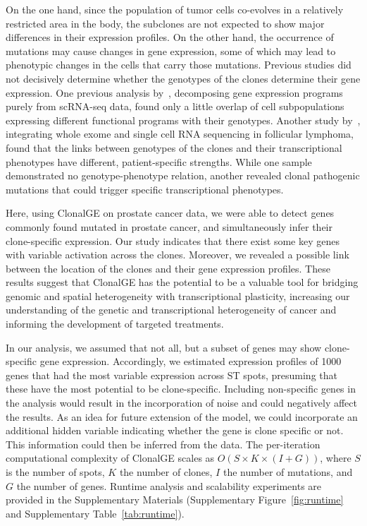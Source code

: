 \documentclass[unnumsec,webpdf,contemporary,large]{oup-authoring-template}%
\theoremstyle{thmstyleone}%
\theoremstyle{thmstyletwo}%
\theoremstyle{thmstylethree}%
\newcommand{\rev}[1]{{\color{revisionblue}#1}}
\begin{document}
 On the one hand, since the population of tumor cells co-evolves in a relatively restricted area in the body, the subclones are not expected to show major differences in their expression profiles. On the other hand, the occurrence of mutations may cause changes in gene expression, some of which may lead to phenotypic changes in the  cells that carry those mutations. Previous studies did not decisively determine whether the genotypes of the clones determine their gene expression. One previous analysis by~\cite{Kinker2020},  decomposing gene expression programs purely from scRNA-seq data,  found only a little overlap of cell subpopulations expressing different functional programs with their genotypes. Another study by~\cite{Oksza-Orzechowski2024}, integrating whole exome and single cell RNA sequencing in follicular lymphoma, found that the links between genotypes of the clones and their transcriptional phenotypes have different, patient-specific strengths. While one  sample demonstrated no genotype-phenotype relation,  another revealed clonal pathogenic mutations  that could trigger specific transcriptional phenotypes.  %
 
 Here, using ClonalGE on prostate cancer data, we were able to detect genes commonly found mutated in prostate cancer, and simultaneously infer their clone-specific expression. Our study indicates that there exist some key genes with variable activation across the clones. Moreover, we revealed a possible link between the location of the clones and their gene expression profiles. These results suggest that ClonalGE has the potential to be a valuable tool for bridging genomic and spatial heterogeneity with transcriptional plasticity, increasing our understanding of the genetic and transcriptional heterogeneity  of cancer and informing the development of targeted treatments.
 
 In our analysis, we  assumed that not all, but a subset of genes may show clone-specific gene expression. Accordingly, we estimated expression profiles of 1000 genes that had the most variable expression  across ST spots, presuming that these have the most potential to be clone-specific. Including non-specific genes in the analysis would result in the incorporation of noise and  could negatively affect the results. As an idea for future extension of the model, we could incorporate an additional hidden variable indicating whether the gene is clone specific or not. This information could then be inferred from the data. \rev{The per-iteration computational complexity of ClonalGE scales as $O(S \times K \times (I + G))$, where $S$ is the number of spots, $K$ the number of clones, $I$ the number of mutations, and $G$ the number of genes. Runtime analysis and scalability experiments are provided in the Supplementary Materials (Supplementary Figure~\ref{fig:runtime} and Supplementary Table~\ref{tab:runtime}).}
\end{document}
